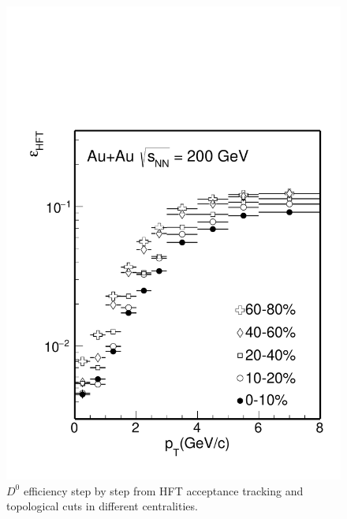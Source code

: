 \begin{figure}[htbp]
\begin{minipage}[htbp]{0.52\linewidth}
\centering
\includegraphics[width=1.0\textwidth,angle=0]{figure/Run14_D0HFT/Datad0Eff_hftTopo.pdf}
\caption{ $D^0$ efficiency step by step from HFT acceptance tracking and topological cuts in different centralities. \label{D0effStep3}}
\end{minipage}
\hfill
\begin{minipage}[htbp]{0.52\linewidth}
\centering

\end{minipage}
\end{figure}
